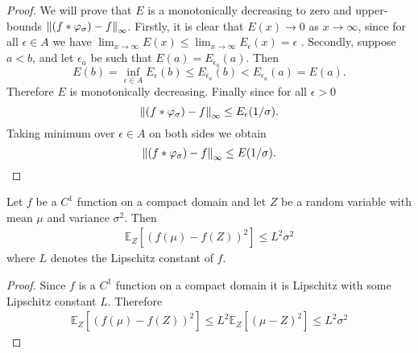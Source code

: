 \begin{proof}
    We will prove that $E$ is a monotonically decreasing to zero and upper-bounds $\left\lVert (f \ast \varphi_\sigma) - f \right\rVert_{\infty}$.
    Firstly, it is clear that $E(x) \to 0$ as $x \to \infty$, since for all $\epsilon \in A$ we have $\lim_{x \to \infty} E(x) \leq \lim_{x \to \infty} E_{\epsilon}(x)=\epsilon$ . 
    Secondly, suppose $a < b$, and let $\epsilon_a$ be such that $E(a) = E_{\epsilon_a}(a)$. Then
    $$E(b) = \inf_{\epsilon \in A} E_{\epsilon}(b) \leq E_{\epsilon_a}(b) < E_{\epsilon_a}(a) = E(a).$$
    Therefore $E$ is monotonically decreasing.
    Finally since for all $\epsilon > 0$
    $$ \left\lVert (f \ast \varphi_\sigma) - f \right\rVert_{\infty} \leq E_{\epsilon}(1/\sigma). $$
    Taking minimum over $\epsilon \in A$ on both sides we obtain 
    $$ \left\lVert (f \ast \varphi_\sigma) - f \right\rVert_{\infty} \leq E(1/\sigma). $$
\end{proof}

\begin{lemma}
    \label{lemma: Lpz}
    Let $f$ be a $C^1$ function on a compact domain and let $Z$ be a random variable with mean $\mu$ and variance $\sigma^2$.
    Then
    \begin{gather*}
        \mathbb{E}_Z[(f(\mu) - f(Z))^2] \leq L^2 \sigma^2
    \end{gather*}
    where $L$ denotes the Lipschitz constant of $f$.
\end{lemma}
\begin{proof}
Since  $f$ is a $C^1$ function on a compact domain it is Lipschitz with some Lipschitz constant $L$. Therefore
\begin{align*}
    \mathbb{E}_Z[(f(\mu) - f(Z))^2] 
    \leq L^2\mathbb{E}_Z[(\mu - Z)^2]
    \leq L^2 \sigma^2
\end{align*}    
\end{proof}

